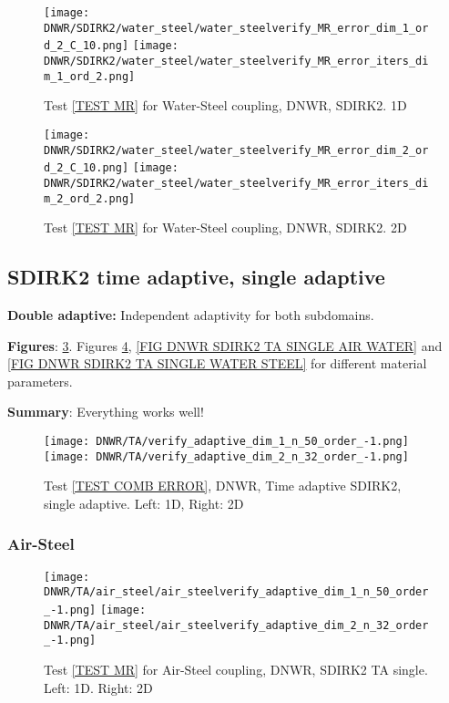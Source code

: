 \documentclass[a4paper,10pt]{article}
\begin{document}
\begin{figure}[!ht]
\texttt{[image: DNWR/SDIRK2/water\_steel/water\_steelverify\_MR\_error\_dim\_1\_ord\_2\_C\_10.png]}
\texttt{[image: DNWR/SDIRK2/water\_steel/water\_steelverify\_MR\_error\_iters\_dim\_1\_ord\_2.png]}
\caption{Test \ref{TEST MR} for Water-Steel coupling, DNWR, SDIRK2. 1D}
\label{FIG DNWR SDIRK2 WATER STEEL 1D}
\end{figure}

\begin{figure}[!ht]
\texttt{[image: DNWR/SDIRK2/water\_steel/water\_steelverify\_MR\_error\_dim\_2\_ord\_2\_C\_10.png]}
\texttt{[image: DNWR/SDIRK2/water\_steel/water\_steelverify\_MR\_error\_iters\_dim\_2\_ord\_2.png]}
\caption{Test \ref{TEST MR} for Water-Steel coupling, DNWR, SDIRK2. 2D}
\label{FIG DNWR SDIRK2 WATER STEEL 2D}
\end{figure}

\FloatBarrier
\subsection{SDIRK2 time adaptive, single adaptive}\label{SEC DWNR SDIRK2 TA SINGLE}
% 
\textbf{Double adaptive:} Independent adaptivity for both subdomains.

\textbf{Figures}: \ref{FIG DNWR SDIRK2 TA SINGLE ERROR}. Figures \ref{FIG DNWR SDIRK2 TA SINGLE AIR STEEL}, \ref{FIG DNWR SDIRK2 TA SINGLE AIR WATER} and \ref{FIG DNWR SDIRK2 TA SINGLE WATER STEEL} for different material parameters.

\textbf{Summary}: Everything works well!

\begin{figure}[!ht]
\texttt{[image: DNWR/TA/verify\_adaptive\_dim\_1\_n\_50\_order\_-1.png]}
\texttt{[image: DNWR/TA/verify\_adaptive\_dim\_2\_n\_32\_order\_-1.png]}
\caption{Test \ref{TEST COMB ERROR}, DNWR, Time adaptive SDIRK2, single adaptive. Left: 1D, Right: 2D}
\label{FIG DNWR SDIRK2 TA SINGLE ERROR}
\end{figure}

\FloatBarrier
\subsubsection{Air-Steel}\label{SEC DNWR TA SINGLE AIR STEEL}
% 

\begin{figure}[!ht]
\texttt{[image: DNWR/TA/air\_steel/air\_steelverify\_adaptive\_dim\_1\_n\_50\_order\_-1.png]}
\texttt{[image: DNWR/TA/air\_steel/air\_steelverify\_adaptive\_dim\_2\_n\_32\_order\_-1.png]}
\caption{Test \ref{TEST MR} for Air-Steel coupling, DNWR, SDIRK2 TA single. Left: 1D. Right: 2D}
\label{FIG DNWR SDIRK2 TA SINGLE AIR STEEL}
\end{figure}
\end{document}
